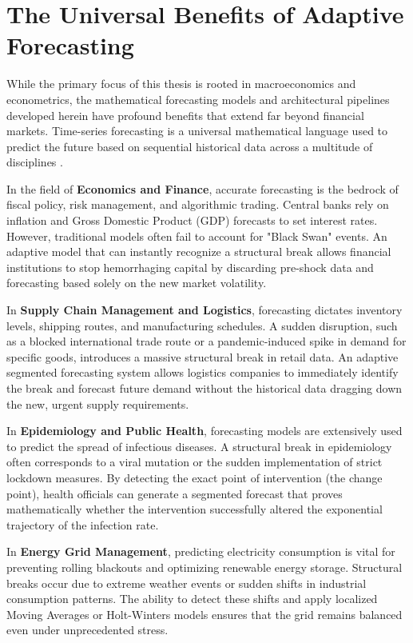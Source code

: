 \documentclass[11pt, a4paper]{report}
\begin{document}
\section{The Universal Benefits of Adaptive Forecasting}
While the primary focus of this thesis is rooted in macroeconomics and econometrics, the mathematical forecasting models and architectural pipelines developed herein have profound benefits that extend far beyond financial markets. Time-series forecasting is a universal mathematical language used to predict the future based on sequential historical data across a multitude of disciplines \cite{Makridakis1998}.

In the field of \textbf{Economics and Finance}, accurate forecasting is the bedrock of fiscal policy, risk management, and algorithmic trading. Central banks rely on inflation and Gross Domestic Product (GDP) forecasts to set interest rates. However, traditional models often fail to account for "Black Swan" events. An adaptive model that can instantly recognize a structural break allows financial institutions to stop hemorrhaging capital by discarding pre-shock data and forecasting based solely on the new market volatility.

In \textbf{Supply Chain Management and Logistics}, forecasting dictates inventory levels, shipping routes, and manufacturing schedules. A sudden disruption, such as a blocked international trade route or a pandemic-induced spike in demand for specific goods, introduces a massive structural break in retail data. An adaptive segmented forecasting system allows logistics companies to immediately identify the break and forecast future demand without the historical data dragging down the new, urgent supply requirements.

In \textbf{Epidemiology and Public Health}, forecasting models are extensively used to predict the spread of infectious diseases. A structural break in epidemiology often corresponds to a viral mutation or the sudden implementation of strict lockdown measures. By detecting the exact point of intervention (the change point), health officials can generate a segmented forecast that proves mathematically whether the intervention successfully altered the exponential trajectory of the infection rate.

In \textbf{Energy Grid Management}, predicting electricity consumption is vital for preventing rolling blackouts and optimizing renewable energy storage. Structural breaks occur due to extreme weather events or sudden shifts in industrial consumption patterns. The ability to detect these shifts and apply localized Moving Averages or Holt-Winters models ensures that the grid remains balanced even under unprecedented stress.
\end{document}
